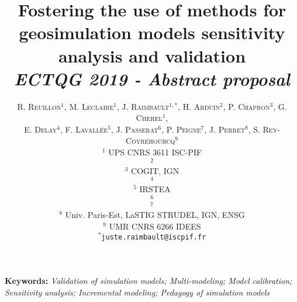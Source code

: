 \documentclass[11pt]{article}
\newcommand{\noun}[1]{\textsc{#1}}
\begin{document}
\title{\vspace{-1cm}Fostering the use of methods for geosimulation models sensitivity analysis and validation
\\\medskip
\textit{ECTQG 2019 - Abstract proposal}
}
\author{\noun{R. Reuillon}$^{1}$, \noun{M. Leclaire}$^{1}$, \noun{J. Raimbault}$^{1,\ast}$, \noun{H. Arduin}$^2$, \noun{P. Chapron}$^3$, \noun{G. Cherel}$^1$,\\
 \noun{E. Delay}$^4$, \noun{F. Lavall{\'e}e}$^5$, \noun{J. Passerat}$^6$, \noun{P. Peigne}$^7$, \noun{J. Perret}$^8$, \noun{S. Rey-Coyrehourcq}$^9$\medskip\\
$^1$ UPS CNRS 3611 ISC-PIF\\
$^2$ \\
$^3$ COGIT, IGN\\
$^4$ \\
$^5$ IRSTEA \\
$^6$ \\
$^7$ \\
$^8$ Univ. Paris-Est, LaSTIG STRUDEL, IGN, ENSG\\
$^9$ UMR CNRS 6266 IDEES
\medskip\\
$^{\ast}$\texttt{juste.raimbault@iscpif.fr}
}
\date{}

\maketitle

\justify



\textbf{Keywords: }\textit{Validation of simulation models; Multi-modeling; Model calibration; Sensitivity analysis; Incremental modeling; Pedagogy of simulation models}

\medskip
\end{document}
